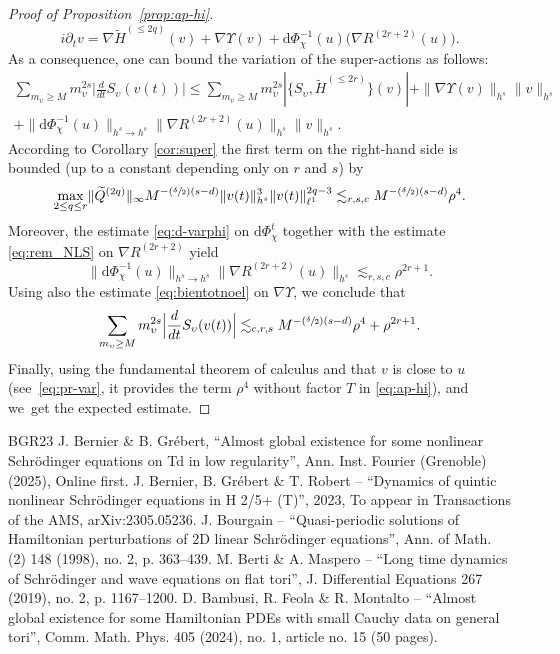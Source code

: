\documentclass[10pt]{amsart}
\newcommand{\Psfrac}[2]{(\sfrac{#1}{#2})}
\theoremstyle{plain}
\theoremstyle{definition}
\newcommand{\1}{\mathbf{1}}
\begin{document}
\begin{proof}[Proof of Proposition~\ref{prop:ap-hi}]
\[
i\partial_{t}v = \nabla \widetilde{H}^{(\leq 2q)}(v) + \nabla \Upsilon (v) + \mathrm{d}\Phi_\chi^{-1}(u)\bigl(\nabla R^{(2r+2)}(u)\bigr).
\]
As a consequence, one can bound the variation of the super-actions as follows:
\begin{multline}
\label{eq:pr-v}
\sum_{m_\upsilon \geq M}m_\upsilon^{2s}\Big|\frac{d}{dt}S_{\upsilon}(v(t))\Big|
\leq \sum_{m_\upsilon \geq M}m_\upsilon^{2s}|\{S_{\upsilon},\widetilde{H}^{(\leq 2r)}\}(v)|
+ \|\nabla \Upsilon (v)\|_{h^{s}}\|v\|_{h^{s}}\\+\|\mathrm{d}\Phi_\chi^{-1}(u)\|_{h^{s}\to h^{s}}\|\nabla R^{(2r+2)}(u)\|_{h^{s}}\|v\|_{h^{s}}.
\end{multline}
According to Corollary \ref{cor:super} the first term on the right-hand side is bounded (up to a constant depending only on $r$ and $s$) by
\[
\underset{2\leq q \leq r}{\max} \|\widetilde{Q}^{(2q)}\|_{\infty} M^{-\Psfrac{\delta}{2}(s-d)}\|v(t)\|_{h^{s}}^{3} \|v(t)\|_{\ell^{1}}^{2q-3} \lesssim_{r,s,c} M^{-\Psfrac{\delta}{2}(s-d)} \rho^4.
\]
Moreover, the estimate \eqref{eq:d-varphi} on $\mathrm{d}\Phi_\chi^{t}$ together with the estimate \eqref{eq:rem_NLS} on $\nabla R^{(2r+2)}$ yield
\[
\|\mathrm{d}\Phi_\chi^{-1}(u)\|_{h^{s}\to h^{s}}\| \nabla R^{(2r+2)} (u)\|_{h^{s}} \lesssim_{r,s,c} \rho^{2r+1}.
\]
Using also the estimate \eqref{eq:bientotnoel} on $\nabla \Upsilon$,
we conclude that
\[
\sum_{m_\upsilon \geq M}m_\upsilon^{2s}\Big|\frac{d}{dt}S_{\upsilon}(v(t))\Big| \lesssim_{c,r,s} M^{-\Psfrac{\delta}{2}(s-d)} \rho^4+ \rho^{2r+1}.
\]
Finally, using the fundamental theorem of calculus and that $v$ is close to $u$ (see~\eqref{eq:pr-var}, it provides the term $\rho^4$ without factor $T$ in \eqref{eq:ap-hi}), and we~get the expected estimate.
\end{proof}
\begin{thebibliography}{BGR23}
 J. Bernier \& B. Grébert, “Almost global existence for some nonlinear Schrödinger equations on Td in low regularity”, Ann. Inst. Fourier (Grenoble) (2025), Online first.
 J. Bernier, B. Grébert \& T. Robert – “Dynamics of quintic nonlinear Schrödinger equations in H 2/5+ (T)”, 2023, To appear in Transactions of the AMS, arXiv:2305.05236.
 J. Bourgain – “Quasi-periodic solutions of Hamiltonian perturbations of 2D linear Schrödinger equations”, Ann. of Math. (2) 148 (1998), no. 2, p. 363–439.
 M. Berti \& A. Maspero – “Long time dynamics of Schrödinger and wave equations on flat tori”, J. Differential Equations 267 (2019), no. 2, p. 1167–1200.
 D. Bambusi, R. Feola \& R. Montalto – “Almost global existence for some Hamiltonian PDEs with small Cauchy data on general tori”, Comm. Math. Phys. 405 (2024), no. 1, article no. 15 (50 pages).
\end{thebibliography}
\end{document}
